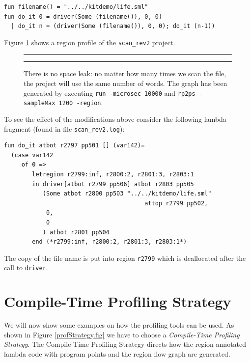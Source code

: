 \documentclass[12pt]{book}
\begin{document}
\begin{verbatim}
fun filename() = "../../kitdemo/life.sml"
fun do_it 0 = driver(Some (filename()), 0, 0)
  | do_it n = (driver(Some (filename()), 0, 0); do_it (n-1))
\end{verbatim}
\noindent
Figure \ref{scan_rev2_1.fig} shows a region profile of the
\texttt{scan\_rev2} project.

\begin{figure}[htb]
\hrule
\medskip

\begin{center}
\end{center}
  \caption{There is no space leak: no matter how many times we scan the
    file, the project will use the same number of words. The graph has been
    generated by executing \texttt{run -microsec 10000} and \texttt{rp2ps
      -sampleMax 1200 -region}.}\label{scan_rev2_1.fig}
\medskip

\hrule
\end{figure}
To see the effect of the modifications above consider the following lambda
fragment (found in file \texttt{scan\_rev2.log}):

\begin{verbatim}
fun do_it atbot r2797 pp501 [] (var142)= 
  (case var142 
     of 0 => 
        letregion r2799:inf, r2800:2, r2801:3, r2803:1 
        in driver[atbot r2799 pp506] atbot r2803 pp505 
           (Some atbot r2800 pp503 "../../kitdemo/life.sml"
                                        attop r2799 pp502, 
            0, 
            0
           ) atbot r2801 pp504 
        end (*r2799:inf, r2800:2, r2801:3, r2803:1*)
\end{verbatim}                                
\noindent
The copy of the file name is put into region \texttt{r2799} which is
deallocated after the call to \texttt{driver}.

\section{Compile-Time Profiling Strategy}

We will now show some examples on how the profiling tools can be used. As
shown in Figure \ref{profStrategy.fig} we have to choose a 
%
\emph{Compile-Time Profiling Strategy}. The Compile-Time Profiling
Strategy directs how the region-annotated lambda code with program
points and the region flow graph are generated.
\end{document}
